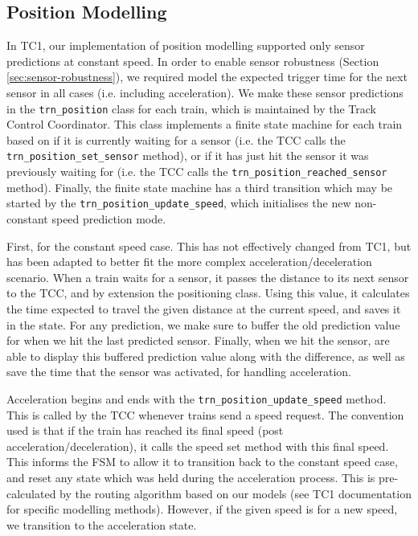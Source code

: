 \documentclass[12pt, titlepage]{article}
\begin{document}
    \subsection{Position Modelling}
    \label{sec:positioning}
    
    In TC1, our implementation of position modelling supported only sensor predictions at constant speed. In order to enable sensor robustness (Section \ref{sec:sensor-robustness}), we required model the expected trigger time for the next sensor in all cases (i.e. including acceleration). We make these sensor predictions in the \verb`trn_position` class for each train, which is maintained by the Track Control Coordinator. This class implements a finite state machine for each train based on if it is currently waiting for a sensor (i.e. the TCC calls the \verb`trn_position_set_sensor` method), or if it has just hit the sensor it was previously waiting for (i.e. the TCC calls the \verb`trn_position_reached_sensor` method). Finally, the finite state machine has a third transition which may be started by the \verb`trn_position_update_speed`, which initialises the new non-constant speed prediction mode.
    
    First, for the constant speed case. This has not effectively changed from TC1, but has been adapted to better fit the more complex acceleration/deceleration scenario. When a train waits for a sensor, it passes the distance to its next sensor to the TCC, and by extension the positioning class. Using this value, it calculates the time expected to travel the given distance at the current speed, and saves it in the state. For any prediction, we make sure to buffer the old prediction value for when we hit the last predicted sensor. Finally, when we hit the sensor, are able to display this buffered prediction value along with the difference, as well as save the time that the sensor was activated, for handling acceleration.
    
    Acceleration begins and ends with the \verb`trn_position_update_speed` method. This is called by the TCC whenever trains send a speed request. The convention used is that if the train has reached its final speed (post acceleration/deceleration), it calls the speed set method with this final speed. This informs the FSM to allow it to transition back to the constant speed case, and reset any state which was held during the acceleration process. This is pre-calculated by the routing algorithm based on our models (see TC1 documentation for specific modelling methods). However, if the given speed is for a new speed, we transition to the acceleration state.
    
\end{document}
